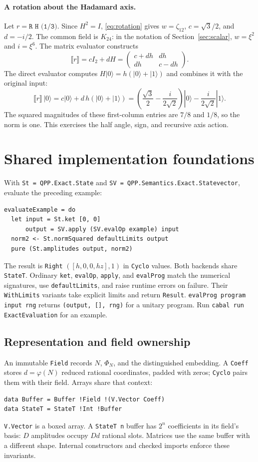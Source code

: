 \documentclass[11pt,a4paper]{article}
\newcommand{\sem}[1]{\llbracket #1\rrbracket}
\newcommand{\code}[1]{\texttt{#1}}
\newcommand{\ket}[1]{|#1\rangle}
\begin{document}
\paragraph{A rotation about the Hadamard axis.}
Let $r=\code{R H (1/3)}$. Since $H^2=I$, \eqref{eq:rotation} gives
$w=\zeta_{12}$, $c=\sqrt3/2$, and $d=-i/2$.
The common field is $K_{24}$: in the notation of Section~\ref{sec:scalar},
$w=\xi^2$ and $i=\xi^6$. The matrix evaluator constructs
\[
\sem r=cI_2+dH=
\begin{pmatrix}c+dh&dh\\dh&c-dh\end{pmatrix}.
\]
The direct evaluator computes $H\ket0=h(\ket0+\ket1)$ and combines it
with the original input:
\[
\sem r\,\ket0
=c\ket0+d\,h(\ket0+\ket1)
=\left(\frac{\sqrt3}{2}-\frac{i}{2\sqrt2}\right)\ket0
 -\frac{i}{2\sqrt2}\ket1.
\]
The squared magnitudes of these first-column entries are $7/8$ and $1/8$,
so the norm is one. This exercises the half angle, sign, and recursive axis action.

\section{Shared implementation foundations}
\label{sec:implementation}
With \code{St = QPP.Exact.State} and
\code{SV = QPP.Semantics.Exact.Statevector}, evaluate the preceding example:
\begin{lstlisting}[label=lst:public-example]
evaluateExample = do
  let input = St.ket [0, 0]
      output = SV.apply (SV.evalOp example) input
  norm2 <- St.normSquared defaultLimits output
  pure (St.amplitudes output, norm2)
\end{lstlisting}
The result is \code{Right} $([h,0,0,hz],1)$ in \code{Cyclo} values.
Both backends share \code{StateT}. Ordinary \code{ket}, \code{evalOp},
\code{apply}, and \code{evalProg} match the numerical signatures, use
\code{defaultLimits}, and raise runtime errors on failure. Their
\code{WithLimits} variants take explicit limits and return \code{Result}.
\code{evalProg program input rng} returns \code{(output, [], rng)} for a
unitary program. Run \code{cabal run ExactEvaluation} for an example.

\subsection{Representation and field ownership}
An immutable \code{Field} records $N$, $\Phi_N$, and the distinguished
embedding. A \code{Coeff} stores $d=\varphi(N)$ reduced rational coordinates,
padded with zeros; \code{Cyclo} pairs them with their field.
Arrays share that context:
\begin{lstlisting}
data Buffer = Buffer !Field !(V.Vector Coeff)
data StateT = StateT !Int !Buffer
\end{lstlisting}
\code{V.Vector} is a boxed array. A \code{StateT n} buffer has $2^n$
coefficients in its field's basis: $D$ amplitudes occupy $Dd$ rational slots.
Matrices use the same buffer with a different shape. Internal constructors
and checked imports enforce these invariants.
\end{document}
